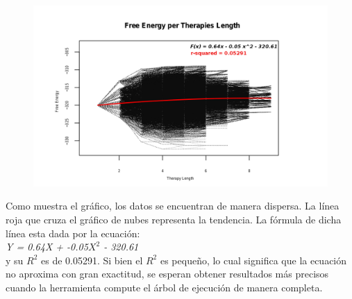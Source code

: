   \begin{figure}[H]\hspace{-2cm}
    \includegraphics[scale=0.47]{images/ffe_vs_thLength.png}
  \end{figure}
    Como muestra el gr\'afico, los datos se encuentran de manera dispersa. La l\'inea roja que cruza el gr\'afico de nubes representa la tendencia. La
  f\'ormula de dicha l\'inea esta dada por la ecuaci\'on:\\ 
  \newline
  \emph{Y = 0.64X + -0.05$X^{2}$ - 320.61} \\ 
  \newline
  y su $R ^{2}$ es de 0.05291. Si bien el $R ^{2}$ es peque\~no, lo cual significa que
  la ecuaci\'on no aproxima con gran exactitud, se esperan obtener resultados m\'as precisos cuando la herramienta compute el \'arbol de ejecuci\'on
  de manera completa.
